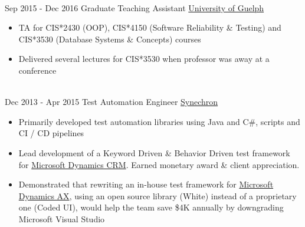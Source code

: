 \documentclass[letterpaper]{twentysecondcv} %
\begin{document}
\begin{twenty}
{{\begin{itemize}
    \end{itemize}}
        }
    \\   
    \twentyitem
   		{Sep 2015 -}
		{Dec 2016}
        {Graduate Teaching Assistant}
        {\href{http://www.uoguelph.ca}{University of Guelph}}
        {}
        {
        {\begin{itemize}
        \item TA for CIS*2430 (OOP), CIS*4150 (Software Reliability \& Testing) and CIS*3530 (Database Systems \& Concepts) courses
        \item Delivered several lectures for CIS*3530 when professor was away at a conference
    \end{itemize}}
        }
     \\
     \twentyitem
   		{Dec 2013 -}
		{Apr 2015}
        {Test Automation Engineer}
        {\href{http://www.synechron.com/}{Synechron}}
        {}
        {
        \begin{itemize}
        \item Primarily developed test automation libraries using Java and C\#, scripts and CI / CD pipelines
        \item Lead development of a Keyword Driven \& Behavior Driven test framework for \href{https://www.microsoft.com/en-ca/dynamics/crm.aspx}{Microsoft Dynamics CRM}. Earned monetary award \& client appreciation.
        \item Demonstrated that rewriting an in-house test framework for \href{https://www.microsoft.com/en-ca/dynamics/erp-ax-overview.aspx}{Microsoft Dynamics AX}, using an open source library (White) instead of a proprietary one (Coded UI), would help the team save \$4K annually by downgrading Microsoft Visual Studio
    \end{itemize}
    	}
        
\end{twenty}

\end{document}
